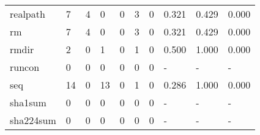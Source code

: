 \begin{longtable}{lp{2.0cm}p{2.0cm}p{2.0cm}p{2.0cm}p{2.0cm}p{2.0cm}p{2.0cm}p{2.0cm}p{2.0cm}}
realpath  &                      7 &                                  4 &                                 0 &                                0 &                                 3 &                               0 &                                0.321 &                                  0.429 &                                0.000 \\
rm        &                      7 &                                  4 &                                 0 &                                0 &                                 3 &                               0 &                                0.321 &                                  0.429 &                                0.000 \\
rmdir     &                      2 &                                  0 &                                 1 &                                0 &                                 1 &                               0 &                                0.500 &                                  1.000 &                                0.000 \\
runcon    &                      0 &                                  0 &                                 0 &                                0 &                                 0 &                               0 &                                    - &                                      - &                                    - \\
seq       &                     14 &                                  0 &                                13 &                                0 &                                 1 &                               0 &                                0.286 &                                  1.000 &                                0.000 \\
sha1sum   &                      0 &                                  0 &                                 0 &                                0 &                                 0 &                               0 &                                    - &                                      - &                                    - \\
sha224sum &                      0 &                                  0 &                                 0 &                                0 &                                 0 &                               0 &                                    - &                                      - &                                    - \\

\end{longtable}
